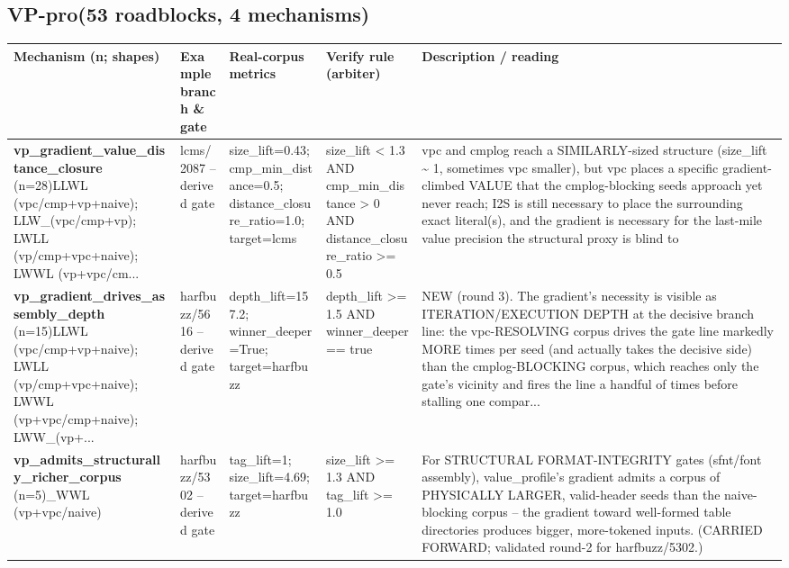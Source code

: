 \documentclass[7pt]{extarticle}
\begin{document}
\subsection*{VP-pro\quad(53 roadblocks, 4 mechanisms)}
{\scriptsize\begin{longtable}{@{}p{3.3cm}p{3.6cm}p{4.4cm}p{4.2cm}p{6.6cm}@{}}
\toprule \textbf{Mechanism (n; shapes)}&\textbf{Example branch \& gate}&\textbf{Real-corpus metrics}&\textbf{Verify rule (arbiter)}&\textbf{Description / reading}\\\midrule\endhead
\textbf{vp\_\allowbreak gradient\_\allowbreak value\_\allowbreak distance\_\allowbreak closure} (n=28)\newline LLWL (vpc/cmp+vp+naive); LLW\_\allowbreak  (vpc/cmp+vp); LWLL (vp/cmp+vpc+naive); LWWL (vp+vpc/cm... & lcms/2087 -- derived gate & size\_\allowbreak lift=0.43; cmp\_\allowbreak min\_\allowbreak distance=0.5; distance\_\allowbreak closure\_\allowbreak ratio=1.0; target=lcms & size\_\allowbreak lift \textless{} 1.3 AND cmp\_\allowbreak min\_\allowbreak distance \textgreater{} 0 AND distance\_\allowbreak closure\_\allowbreak ratio \textgreater{}= 0.5 & vpc and cmplog reach a SIMILARLY-sized structure (size\_\allowbreak lift \textasciitilde{} 1, sometimes vpc smaller), but vpc places a specific gradient-climbed VALUE that the cmplog-blocking seeds approach yet never reach; I2S is still necessary to place the surrounding exact literal(s), and the gradient is necessary for the last-mile value precision the structural proxy is blind to\\\midrule
\textbf{vp\_\allowbreak gradient\_\allowbreak drives\_\allowbreak assembly\_\allowbreak depth} (n=15)\newline LLWL (vpc/cmp+vp+naive); LWLL (vp/cmp+vpc+naive); LWWL (vp+vpc/cmp+naive); LWW\_\allowbreak  (vp+... & harfbuzz/5616 -- derived gate & depth\_\allowbreak lift=157.2; winner\_\allowbreak deeper=True; target=harfbuzz & depth\_\allowbreak lift \textgreater{}= 1.5 AND winner\_\allowbreak deeper == true & NEW (round 3). The gradient's necessity is visible as ITERATION/EXECUTION DEPTH at the decisive branch line: the vpc-RESOLVING corpus drives the gate line markedly MORE times per seed (and actually takes the decisive side) than the cmplog-BLOCKING corpus, which reaches only the gate's vicinity and fires the line a handful of times before stalling one compar...\\\midrule
\textbf{vp\_\allowbreak admits\_\allowbreak structurally\_\allowbreak richer\_\allowbreak corpus} (n=5)\newline \_\allowbreak WWL (vp+vpc/naive) & harfbuzz/5302 -- derived gate & tag\_\allowbreak lift=1; size\_\allowbreak lift=4.69; target=harfbuzz & size\_\allowbreak lift \textgreater{}= 1.3 AND tag\_\allowbreak lift \textgreater{}= 1.0 & For STRUCTURAL FORMAT-INTEGRITY gates (sfnt/font assembly), value\_\allowbreak profile's gradient admits a corpus of PHYSICALLY LARGER, valid-header seeds than the naive-blocking corpus -- the gradient toward well-formed table directories produces bigger, more-tokened inputs. (CARRIED FORWARD; validated round-2 for harfbuzz/5302.)\\\midrule

\end{longtable}}
\end{document}
